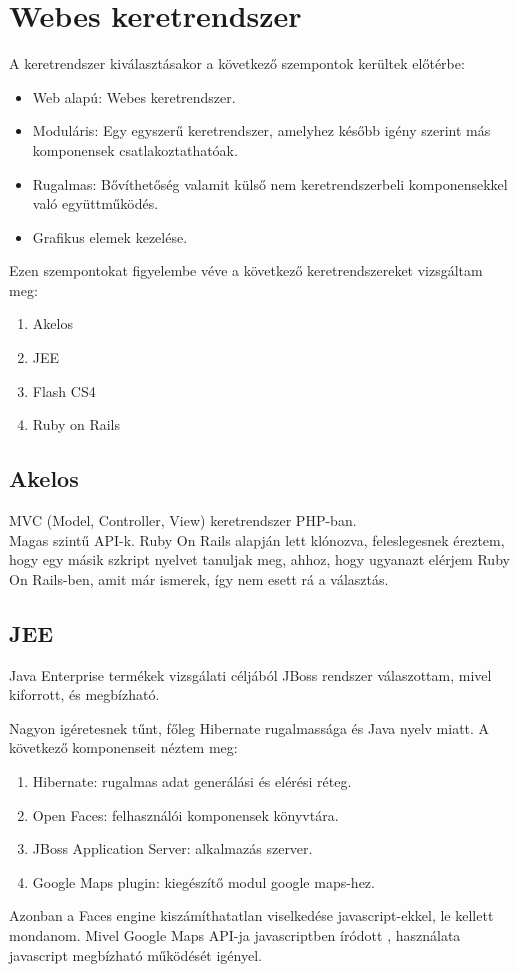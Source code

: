 \section{Webes keretrendszer} %
A keretrendszer kiválasztásakor a következő szempontok kerültek előtérbe:
\begin{itemize}
	\item Web alapú: Webes keretrendszer.
	\item Moduláris: Egy egyszerű keretrendszer, amelyhez később igény szerint más komponensek csatlakoztathatóak.
	\item Rugalmas: Bővíthetőség valamit külső nem keretrendszerbeli komponensekkel való együttműködés.
	\item Grafikus elemek kezelése.
\end{itemize}
Ezen szempontokat figyelembe véve a következő keretrendszereket vizsgáltam meg:
\begin{enumerate}
	\item Akelos
	\item JEE
	\item Flash CS4
	\item Ruby on Rails
\end{enumerate}

	\subsection{Akelos} %
	\label{sub:akelos}
	
	MVC (Model, Controller, View) keretrendszer PHP-ban. 
	\\
	Magas szintű API-k. Ruby On Rails alapján lett klónozva, feleslegesnek éreztem, hogy
	egy másik szkript nyelvet tanuljak meg, ahhoz, hogy ugyanazt elérjem Ruby On Rails-ben, amit már ismerek, így nem esett rá a választás. 

	\subsection{JEE} %
	Java Enterprise termékek vizsgálati céljából JBoss rendszer válaszottam, mivel kiforrott, és megbízható.\\
	\label{sub:jee}
			

	Nagyon igéretesnek tűnt, főleg Hibernate rugalmassága és Java nyelv miatt. A következő komponenseit néztem meg:
	\begin{enumerate}
		\item Hibernate: rugalmas adat generálási és elérési réteg.
		\item Open Faces: felhasználói komponensek könyvtára.
		\item JBoss Application Server: alkalmazás szerver.
		\item Google Maps plugin: kiegészítő modul google maps-hez.
	\end{enumerate}
	Azonban a Faces engine kiszámíthatatlan viselkedése javascript-ekkel, le kellett mondanom. Mivel Google Maps API-ja javascriptben íródott
	, használata javascript megbízható működését igényel.
	
